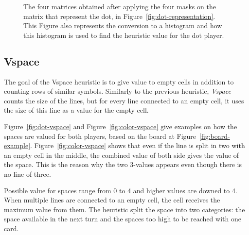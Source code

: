 \documentclass[runningheads]{llncs}
\begin{document}
\begin{figure}[ht]
		\caption{The four matrices obtained after applying the four masks on the matrix that represent the dot, in Figure~\ref{fig:dot-representation}.
						This Figure also represents the conversion to a histogram and how this histogram is used to find the heuristic value for the dot player.}
		\label{fig:convolution-results}
\end{figure}

\clearpage
\subsection{Vspace}
\label{sec:vspace}
The goal of the Vspace heuristic is to give value to empty
cells in addition to counting rows of similar
symbols. Similarly to the previous heuristic,
\textit{Vspace} counts the size of the lines, but for every
line connected to an empty cell, it uses the
size of this line as a value for the empty cell.

Figure~\ref{fig:dot-vspace} and
Figure~\ref{fig:color-vspace} give examples on
how the spaces are valued for both players, based
on the board at Figure~\ref{fig:board-example}.
Figure~\ref{fig:color-vspace} shows that even if
the line is split in two with an empty cell in the
middle, the combined value of both side gives the
value of the space. This is the reason why the two
3-values appears even though there is no line of
three.

Possible value for spaces range from 0 to 4 and
higher values are downed to 4. When multiple lines
are connected to an empty cell, the cell receives
the maximum value from them. The heuristic split the
space into two categories: the space available in
the next turn and the spaces too high to be
reached with one card.
\end{document}
